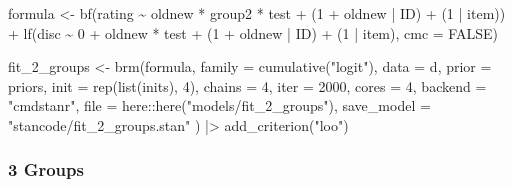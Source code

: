 \documentclass[
  man,floatsintext]{apa7}
\newenvironment{Shaded}{\begin{snugshade}}{\end{snugshade}}
\newcommand{\AttributeTok}[1]{\textcolor[rgb]{0.77,0.63,0.00}{#1}}
\newcommand{\ConstantTok}[1]{\textcolor[rgb]{0.00,0.00,0.00}{#1}}
\newcommand{\DecValTok}[1]{\textcolor[rgb]{0.00,0.00,0.81}{#1}}
\newcommand{\FunctionTok}[1]{\textcolor[rgb]{0.00,0.00,0.00}{#1}}
\newcommand{\NormalTok}[1]{#1}
\newcommand{\OtherTok}[1]{\textcolor[rgb]{0.56,0.35,0.01}{#1}}
\newcommand{\SpecialCharTok}[1]{\textcolor[rgb]{0.00,0.00,0.00}{#1}}
\newcommand{\StringTok}[1]{\textcolor[rgb]{0.31,0.60,0.02}{#1}}
\begin{document}
\begin{Shaded}
\begin{Highlighting}[]
\NormalTok{formula }\OtherTok{\textless{}{-}} \FunctionTok{bf}\NormalTok{(rating }\SpecialCharTok{\textasciitilde{}}\NormalTok{ oldnew }\SpecialCharTok{*}\NormalTok{ group2 }\SpecialCharTok{*}\NormalTok{ test }\SpecialCharTok{+}
\NormalTok{  (}\DecValTok{1} \SpecialCharTok{+}\NormalTok{ oldnew }\SpecialCharTok{|}\NormalTok{ ID) }\SpecialCharTok{+}\NormalTok{ (}\DecValTok{1} \SpecialCharTok{|}\NormalTok{ item)) }\SpecialCharTok{+}
  \FunctionTok{lf}\NormalTok{(disc }\SpecialCharTok{\textasciitilde{}} \DecValTok{0} \SpecialCharTok{+}\NormalTok{ oldnew }\SpecialCharTok{*}\NormalTok{ test }\SpecialCharTok{+}
\NormalTok{    (}\DecValTok{1} \SpecialCharTok{+}\NormalTok{ oldnew }\SpecialCharTok{|}\NormalTok{ ID) }\SpecialCharTok{+}\NormalTok{ (}\DecValTok{1} \SpecialCharTok{|}\NormalTok{ item), }\AttributeTok{cmc =} \ConstantTok{FALSE}\NormalTok{)}

\NormalTok{fit\_2\_groups }\OtherTok{\textless{}{-}} \FunctionTok{brm}\NormalTok{(formula,}
  \AttributeTok{family =} \FunctionTok{cumulative}\NormalTok{(}\StringTok{"logit"}\NormalTok{),}
  \AttributeTok{data =}\NormalTok{ d,}
  \AttributeTok{prior =}\NormalTok{ priors,}
  \AttributeTok{init =} \FunctionTok{rep}\NormalTok{(}\FunctionTok{list}\NormalTok{(inits), }\DecValTok{4}\NormalTok{),}
  \AttributeTok{chains =} \DecValTok{4}\NormalTok{, }\AttributeTok{iter =} \DecValTok{2000}\NormalTok{, }\AttributeTok{cores =} \DecValTok{4}\NormalTok{,}
  \AttributeTok{backend =} \StringTok{"cmdstanr"}\NormalTok{,}
  \AttributeTok{file =}\NormalTok{ here}\SpecialCharTok{::}\FunctionTok{here}\NormalTok{(}\StringTok{"models/fit\_2\_groups"}\NormalTok{),}
  \AttributeTok{save\_model =} \StringTok{"stancode/fit\_2\_groups.stan"}
\NormalTok{) }\SpecialCharTok{|\textgreater{}}
  \FunctionTok{add\_criterion}\NormalTok{(}\StringTok{"loo"}\NormalTok{)}
\end{Highlighting}
\end{Shaded}

\hypertarget{groups-4}{%
\subsubsection{3 Groups}\label{groups-4}}
\end{document}
